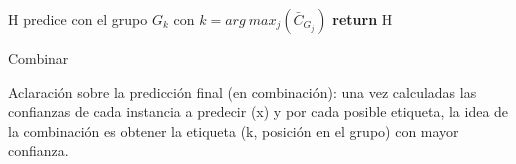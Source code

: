 \begin{algorithm}
    \DontPrintSemicolon
    H predice con el grupo $G_k$ con $k = arg~max_j(\bar{C}_{G_j})$\;
    \textbf{return} H
    \caption{Combinar}\label{pseudo:combinar}
\end{algorithm}

Aclaración sobre la predicción final (en combinación): una vez calculadas las confianzas de cada
instancia a predecir (x) y por cada posible etiqueta, la idea de la combinación
es obtener la etiqueta (k, posición en el grupo) con mayor confianza.